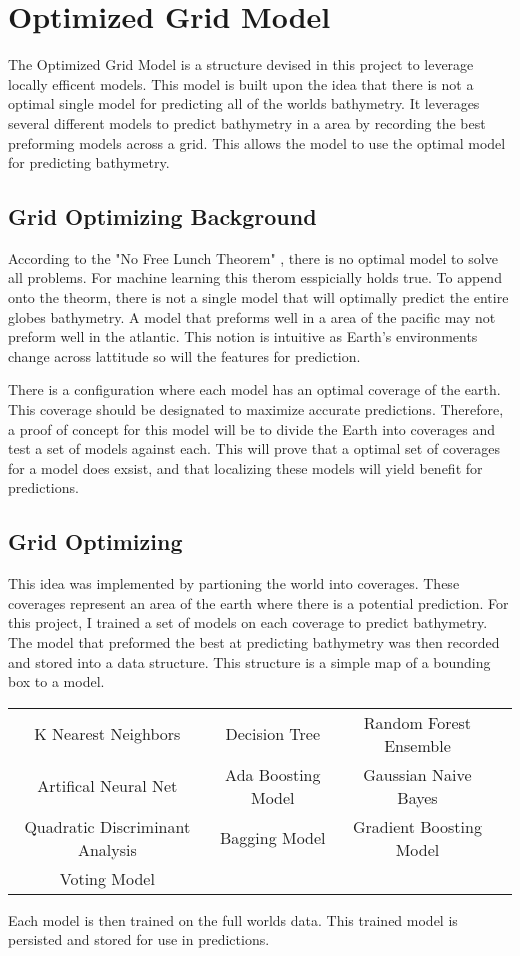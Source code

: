 \section{Optimized Grid Model}
\setlength{\parindent}{10ex}
The Optimized Grid Model is a structure devised in this project to leverage locally efficent models.
This model is built upon the idea that there is not a optimal single model for predicting all of the worlds bathymetry.
It leverages several different models to predict bathymetry in a area by recording the best preforming models across a grid.
This allows the model to use the optimal model for predicting bathymetry.

\subsection{Grid Optimizing Background}
According to the "No Free Lunch Theorem" \cite{wolpert1997no}, there is no optimal model to solve all problems.
For machine learning this therom esspicially holds true.
To append onto the theorm, there is not a single model that will optimally predict the entire globes bathymetry.
A model that preforms well in a area of the pacific may not preform well in the atlantic.
This notion is intuitive as Earth's environments change across lattitude so will the features for prediction.


There is a configuration where each model has an optimal coverage of the earth.
This coverage should be designated to maximize accurate predictions.
Therefore, a proof of concept for this model will be to divide the Earth into coverages and test a set of models against each.
This will prove that a optimal set of coverages for a model does exsist, and that localizing these models will yield benefit for predictions.

\subsection{Grid Optimizing}
This idea was implemented by partioning the world into coverages.
These coverages represent an area of the earth where there is a potential prediction.
For this project, I trained a set of models on each coverage to predict bathymetry.
The model that preformed the best at predicting bathymetry was then recorded and stored into a data structure.
This structure is a simple map of a bounding box to a model.

\begin{table}[htbp]
    \begin{tabular} { |c|c|c| p{10cm}}
        \hline
            K Nearest Neighbors & Decision Tree & Random Forest Ensemble \\
            Artifical Neural Net & Ada Boosting Model & Gaussian Naive Bayes \\
            Quadratic Discriminant Analysis & Bagging Model & Gradient Boosting Model \\
            Voting Model & & \\
        \hline
    \end{tabular}
\end{table}

\par
Each model is then trained on the full worlds data.
This trained model is persisted and stored for use in predictions.
